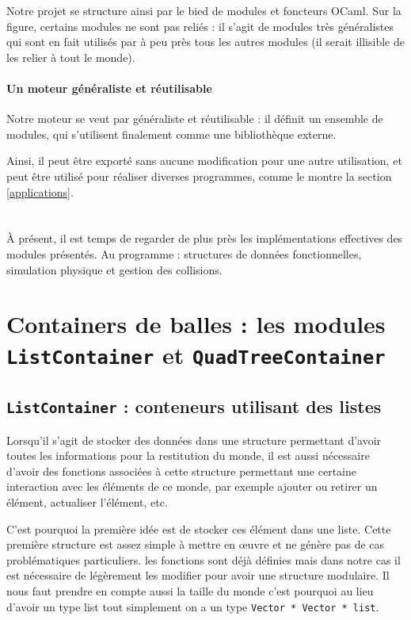 \documentclass[a4paper]{scrartcl}
\begin{document}
Notre projet se structure ainsi par le bied de modules et foncteurs
OCaml. Sur la figure, certains modules ne sont pas reliés : il s'agit
de modules très généralistes qui sont en fait utilisés par à peu près
tous les autres modules (il serait illisible de les relier à tout le
monde).

\paragraph{Un moteur généraliste et réutilisable}

Notre moteur se veut par généraliste et réutilisable : il définit un
ensemble de modules, qui s'utilisent finalement comme une bibliothèque
externe.

Ainsi, il peut être exporté sans aucune modification pour une autre
utilisation, et peut être utilisé pour réaliser diverses programmes,
comme le montre la section \ref{applications}.

\section*{}
À présent, il est temps de regarder de plus près les implémentations
effectives des modules présentés. Au programme : structures de données
fonctionnelles, simulation physique et gestion des collisions.

\section{Containers de balles : les modules \texttt{ListContainer}
  et \texttt{QuadTreeContainer}}
\subsection{\texttt{ListContainer} : conteneurs utilisant des listes}

Lorsqu'il s'agit de stocker des données dans une structure permettant
d'avoir toutes les informations pour la restitution du monde, il est
aussi nécessaire d'avoir des fonctions associées à cette structure
permettant une certaine interaction avec les éléments de ce monde, par
exemple ajouter ou retirer un élément, actualiser l'élément, etc.

C'est pourquoi la première idée est de stocker ces élément dans une
liste. Cette première structure est assez simple à mettre en œuvre et
ne génère pas de cas problématiques particuliers. les fonctions sont
déjà définies mais dans notre cas il est nécessaire de légèrement les
modifier pour avoir une structure modulaire.  Il nous faut prendre en
compte aussi la taille du monde c'est pourquoi au lieu d'avoir un type
list tout simplement on a un type \texttt{Vector * Vector * list}.
\end{document}
